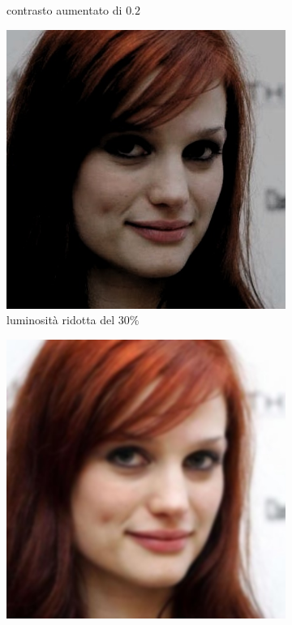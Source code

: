 \begin{figure}[ht]
\begin{subfigure}[t]{0.18\textwidth}
\caption{contrasto aumentato di $0.2$}
\label{sfig:corruption_contrast}
\end{subfigure}\hfill
\begin{subfigure}[t]{0.18\textwidth}
\includegraphics[width=\textwidth]{./Images/brightness_severity_-0.3.jpg}
\caption{luminosità ridotta del $30\%$}
\label{sfig:corruption_brightness}
\end{subfigure}\hfill
\begin{subfigure}[t]{0.18\textwidth}
\includegraphics[width=\textwidth]{./Images/gaussian_blur_severity_2.0.jpg}

\end{subfigure}
\end{figure}
